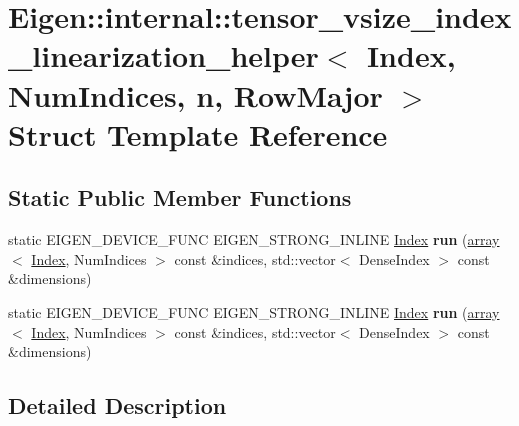 \hypertarget{struct_eigen_1_1internal_1_1tensor__vsize__index__linearization__helper}{}\section{Eigen\+:\+:internal\+:\+:tensor\+\_\+vsize\+\_\+index\+\_\+linearization\+\_\+helper$<$ Index, Num\+Indices, n, Row\+Major $>$ Struct Template Reference}
\label{struct_eigen_1_1internal_1_1tensor__vsize__index__linearization__helper}
\subsection*{Static Public Member Functions}
\begin{DoxyCompactItemize}
\item 
\mbox{\label{struct_eigen_1_1internal_1_1tensor__vsize__index__linearization__helper_ad9583a403e8b5a8ee89ad6fc53296064}} 
static E\+I\+G\+E\+N\+\_\+\+D\+E\+V\+I\+C\+E\+\_\+\+F\+U\+NC E\+I\+G\+E\+N\+\_\+\+S\+T\+R\+O\+N\+G\+\_\+\+I\+N\+L\+I\+NE \hyperlink{namespace_eigen_a62e77e0933482dafde8fe197d9a2cfde}{Index} {\bfseries run} (\hyperlink{class_eigen_1_1array}{array}$<$ \hyperlink{namespace_eigen_a62e77e0933482dafde8fe197d9a2cfde}{Index}, Num\+Indices $>$ const \&indices, std\+::vector$<$ Dense\+Index $>$ const \&dimensions)
\item 
\mbox{\label{struct_eigen_1_1internal_1_1tensor__vsize__index__linearization__helper_ad9583a403e8b5a8ee89ad6fc53296064}} 
static E\+I\+G\+E\+N\+\_\+\+D\+E\+V\+I\+C\+E\+\_\+\+F\+U\+NC E\+I\+G\+E\+N\+\_\+\+S\+T\+R\+O\+N\+G\+\_\+\+I\+N\+L\+I\+NE \hyperlink{namespace_eigen_a62e77e0933482dafde8fe197d9a2cfde}{Index} {\bfseries run} (\hyperlink{class_eigen_1_1array}{array}$<$ \hyperlink{namespace_eigen_a62e77e0933482dafde8fe197d9a2cfde}{Index}, Num\+Indices $>$ const \&indices, std\+::vector$<$ Dense\+Index $>$ const \&dimensions)
\end{DoxyCompactItemize}


\subsection{Detailed Description}

